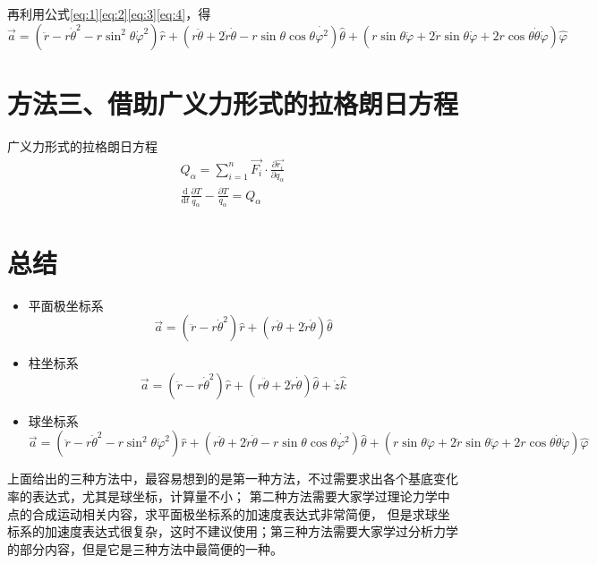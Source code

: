 \documentclass{ctexart}
\begin{document}
    再利用公式\eqref{eq:1}\eqref{eq:2}\eqref{eq:3}\eqref{eq:4}，得
    \begin{equation*}
        \vec{a} = (\ddot{r}-r\dot{\theta}^2-r\sin^2\theta\dot{\varphi}^2)\hat{r}+
        (r\ddot{\theta}+2\dot{r}\dot{\theta}-r\sin\theta\cos\theta\dot{\varphi^2})\hat{\theta}+
        (r\sin\theta\ddot{\varphi}+2\dot{r}\sin\theta\dot{\varphi}+
        2r\cos\theta\dot{\theta}\dot{\varphi})\hat{\varphi}
    \end{equation*}

    \section{方法三、借助广义力形式的拉格朗日方程}\label{sec:4}

    广义力形式的拉格朗日方程
    \begin{gather*}
        Q_{\alpha} = \sum_{i = 1}^{n} \vec{F_i}\cdot\frac{\partial\vec{r_i}}{\partial q_{\alpha}} \\
        \frac{\mathrm{d}}{\mathrm{d}t}\frac{\partial T}{\dot{q_{\alpha}}} -
        \frac{\partial T}{q_{\alpha}} = Q_{\alpha}
    \end{gather*}

    \section{总结}\label{sec:5}

    \begin{itemize}
        \item 平面极坐标系
            \begin{equation*}
                \vec{a} = (\ddot{r}-r\dot{\theta}^2)\hat{r}+
                (r\ddot{\theta}+2\dot{r}\dot{\theta})\hat{\theta}
            \end{equation*}
        \item 柱坐标系
            \begin{equation*}
                \vec{a} = (\ddot{r}-r\dot{\theta}^2)\hat{r}+
                (r\ddot{\theta}+2\dot{r}\dot{\theta})\hat{\theta}+
                \dot{z}\hat{k}
            \end{equation*}
        \item 球坐标系
            \begin{equation*}
                \vec{a} = (\ddot{r}-r\dot{\theta}^2-r\sin^2\theta\dot{\varphi}^2)\hat{r}+
                (r\ddot{\theta}+2\dot{r}\dot{\theta}-r\sin\theta\cos\theta\dot{\varphi^2})\hat{\theta}+
                (r\sin\theta\ddot{\varphi}+2\dot{r}\sin\theta\dot{\varphi}+
                2r\cos\theta\dot{\theta}\dot{\varphi})\hat{\varphi}
            \end{equation*}
    \end{itemize}

    上面给出的三种方法中，最容易想到的是第一种方法，不过需要求出各个基底变化率的表达式，尤其是球坐标，计算量不小；
    第二种方法需要大家学过理论力学中点的合成运动相关内容，求平面极坐标系的加速度表达式非常简便，
    但是求球坐标系的加速度表达式很复杂，这时不建议使用；第三种方法需要大家学过分析力学的部分内容，但是它是三种方法中最简便的一种。
\end{document}
